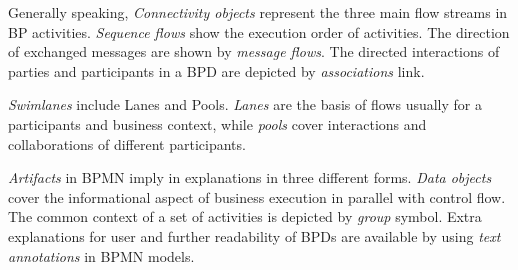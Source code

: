 \documentclass{article}
\begin{document}
Generally speaking, \textit{Connectivity objects} represent the three main flow streams in BP activities. \textit{Sequence flows} show the execution order of activities. The direction of exchanged messages are shown by \textit{message flows}. The directed interactions of parties and participants in a BPD are depicted by \textit{associations} link.

\textit{Swimlanes} include Lanes and Pools. \textit{Lanes} are the basis of flows usually for a participants and business context, while \textit{pools} cover interactions and collaborations of different participants. 

\textit{Artifacts} in BPMN imply in explanations in three different forms.\textit{ Data objects} cover the informational aspect of business execution in parallel with control flow. The common context of a set of activities is depicted by \textit{group} symbol. Extra explanations for user and further readability of BPDs are available by using \textit{text annotations} in BPMN models.
\end{document}
